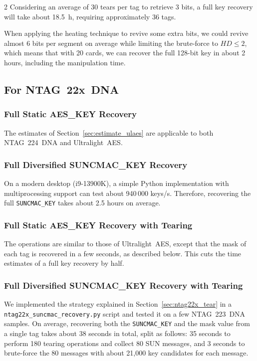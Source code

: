 \documentclass[10pt,letterpaper]{article}
\begin{document}
\begin{multicols}{2}
Considering an average of 30 tears per tag to retrieve 3 bits, a full key recovery will take about 18.5~h, requiring approximately 36 tags.

When applying the heating technique to revive some extra bits, we could revive almost 6 bits per segment on average while limiting the brute-force to $HD \leq 2$, which means that with 20 cards, we can recover the full 128-bit key in about 2 hours, including the manipulation time.

\subsection{For NTAG~22x~DNA}
\label{sec_estimate_ntag22x}
\subsubsection*{Full Static AES\_KEY Recovery}
The estimates of Section~\ref{sec:estimate_ulaes} are applicable to both NTAG~224~DNA and Ultralight~AES.

\subsubsection*{Full Diversified SUNCMAC\_KEY Recovery}
On a modern desktop (i9-13900K), a simple Python implementation with multiprocessing support can test about 940\,000 keys/s. 
Therefore, recovering the full \texttt{SUNCMAC\_KEY} takes about 2.5 hours on average.

\subsubsection*{Full Static AES\_KEY Recovery with Tearing}
The operations are similar to those of Ultralight~AES, except that the mask of each tag is recovered in a few seconds, as described below. This cuts the time estimates of a full key recovery by half.

\subsubsection*{Full Diversified SUNCMAC\_KEY Recovery with Tearing}
We implemented the strategy explained in Section~\ref{sec:ntag22x_tear} in a \texttt{ntag22x\_suncmac\_recovery.py} script and tested it on a few NTAG~223~DNA samples.
On average, recovering both the \texttt{SUNCMAC\_KEY} and the mask value from a single tag takes about 38 seconds in total, split as follows: 35 seconds to perform 180 tearing operations and collect 80 SUN messages, and 3 seconds to brute-force the 80 messages with about 21,000 key candidates for each message.


\end{multicols}
\end{document}
